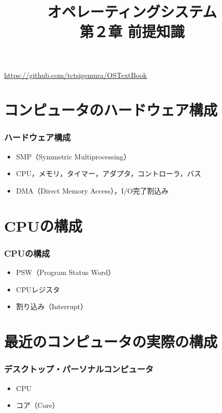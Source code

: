 \documentclass[unicode,handout]{beamer}                   %
\begin{document}
\title[前提知識]{オペレーティングシステム\\第２章 前提知識}
\date{}
\begin{frame}
  \titlepage
  \centerline{\url{https://github.com/tctsigemura/OSTextBook}}
\end{frame}


\section{コンピュータのハードウェア構成}
\begin{frame}
  \frametitle{ハードウェア構成}
  \begin{itemize}
    \item SMP（Symmetric Multiprocessing）
    \item CPU，メモリ，タイマー，アダプタ，コントローラ，バス
    \item DMA（Direct Memory Access），I/O完了割込み
  \end{itemize}
\end{frame}

\section{CPUの構成}
\begin{frame}
  \frametitle{CPUの構成}
  \begin{itemize}
    \item PSW（Program Status Word）
    \item CPUレジスタ
    \item 割り込み（Interrupt）
  \end{itemize}
\end{frame}

\section{最近のコンピュータの実際の構成}
\begin{frame}
  \frametitle{デスクトップ・パーソナルコンピュータ}
  \begin{itemize}
    \item CPU
    \item コア（Core）
  \end{itemize}
\end{frame}
\end{document}
